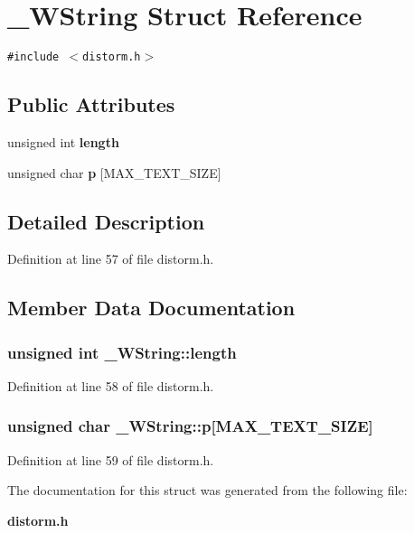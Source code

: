 \section{\_\-WString Struct Reference}
\label{struct__WString}
{\tt \#include $<$distorm.h$>$}

\subsection*{Public Attributes}
\begin{CompactItemize}
\item 
unsigned int {\bf length}
\item 
unsigned char {\bf p} [MAX\_\-TEXT\_\-SIZE]
\end{CompactItemize}


\subsection{Detailed Description}


Definition at line 57 of file distorm.h.

\subsection{Member Data Documentation}
\subsubsection[{length}]{\setlength{\rightskip}{0pt plus 5cm}unsigned int {\bf \_\-WString::length}}\label{struct__WString_f672a36bd5ac43eb02c489ca2ffdbe8f}




Definition at line 58 of file distorm.h.
\subsubsection[{p}]{\setlength{\rightskip}{0pt plus 5cm}unsigned char {\bf \_\-WString::p}[MAX\_\-TEXT\_\-SIZE]}\label{struct__WString_3b8b97fdc19efc61b848a24d6d4b80fe}




Definition at line 59 of file distorm.h.

The documentation for this struct was generated from the following file:\begin{CompactItemize}
\item 
{\bf distorm.h}\end{CompactItemize}
